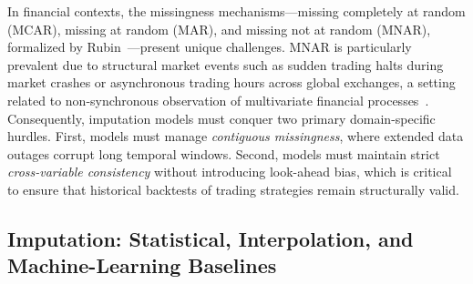 \documentclass[11pt,a4paper]{article}
\begin{document}
In financial contexts, the missingness mechanisms—missing completely at random (MCAR), missing at random (MAR), and missing not at random (MNAR), formalized by Rubin~\citep{rubin1976inference}—present unique challenges. MNAR is particularly prevalent due to structural market events such as sudden trading halts during market crashes or asynchronous trading hours across global exchanges, a setting related to non-synchronous observation of multivariate financial processes~\citep{hayashi2005covariance}. Consequently, imputation models must conquer two primary domain-specific hurdles. First, models must manage \textit{contiguous missingness}, where extended data outages corrupt long temporal windows. Second, models must maintain strict \textit{cross-variable consistency} without introducing look-ahead bias, which is critical to ensure that historical backtests of trading strategies remain structurally valid.

\subsection{Imputation: Statistical, Interpolation, and Machine-Learning Baselines}
\end{document}
